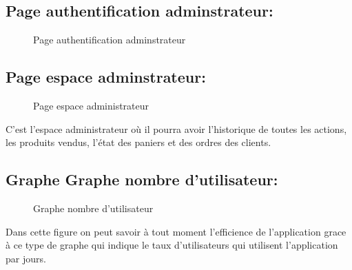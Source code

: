 \documentclass[a4paper]{report}
\begin{document}
\begin{doublespace}
\begin{doublespace}
\begin{doublespace}
\begin{doublespace}
\begin{doublespace}
                    \subsection{Page authentification adminstrateur:}
                    \begin{figure}[H]
                        \begin{center}
                            \caption{Page authentification adminstrateur}
                        \end{center}
                    \end{figure}
                    \subsection{Page espace adminstrateur:}
                    \begin{figure}[H]
                        \begin{center}
                            \caption{Page espace administrateur}
                        \end{center}
                    \end{figure}
                    C'est l'espace administrateur où il pourra avoir
                    l'historique de toutes les actions, les produits vendus, l'état des paniers et
                    des ordres des clients.
                    \subsection{Graphe Graphe nombre d'utilisateur:}

                    \begin{figure}[H]
                        \begin{center}
                            \caption{Graphe nombre d'utilisateur}
                        \end{center}
                    \end{figure}
                    Dans cette figure on peut savoir à tout moment
                    l'efficience de l'application grace à ce type de graphe qui indique le taux
                    d'utilisateurs qui utilisent l'application par jours.

\end{doublespace}
\end{doublespace}
\end{doublespace}
\end{doublespace}
\end{doublespace}
\end{document}
